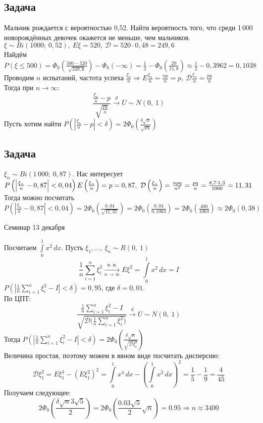 \documentclass[12pt, a4paper]{article}
\begin{document}
    \subsection*{Задача}
    Мальчик рождается с вероятностью 0,52. Найти вероятность того, что среди 1\,000 новорождённых девочек окажется не меньше, чем мальчиков.\\
    $\xi \sim Bi(1000;\ 0,52),\ E\xi = 520,\ \mathcal{D} = 520\cdot 0,48 = 249,6$\\
    Найдём $P(\xi \leq 500) = \Phi_0\left( \frac{500 - 520}{\sqrt{249,6}} \right) - \Phi_0(-\infty) = \frac{1}{2} - \Phi_0\left( \frac{20}{15,8} \right) \approx \frac{1}{2} - 0,3962 = 0,1038$\\
    Проводим $n$ испытаний, частота успеха $\frac{\xi_n}{n}\Rightarrow E\frac{\xi_n}{n} = \frac{np}{n} = p,\ \mathcal{D}\frac{\xi_n}{n} = \frac{pq}{n}$\\
    Тогда при $n\to\infty$:
    \[\frac{\frac{\xi_n}{n} - p}{\sqrt{\frac{pq}{n}}}\xrightarrow{d} U \sim N(0,\ 1)\]
    Пусть хотим найти $P\left( \left| \frac{\xi_n}{n} - p \right| < \delta\right) = 2\Phi_0\left( \frac{\delta\sqrt{n}}{\sqrt{pq}} \right)$
    \subsection*{Задача}
    $\xi_n \sim Bi(1\,000;\ 0,87)$. Нас интересует $P \left( \left| \frac{\xi_n}{n} - 0,87 \right| < 0,04 \right)\\
    E\left( \frac{\xi_n}{n} \right) = p = 0,87,\ \mathcal{D}\left( \frac{\xi_n}{n} \right) = \frac{npq}{n^2} = \frac{pq}{n} = \frac{8,7\cdot 1,3}{1000} = 11,31$\\
    Тогда можно посчитать $P \left( \left| \frac{\xi_n}{n} - 0,87 \right| < 0,04 \right) = 2\Phi_0\left( \frac{0,04}{\sqrt{11,31}} \right) = 2\Phi_0\left( \frac{0,04}{0,1063} \right) = 2\Phi_0\left( \frac{400}{1063} \right) \approx 2\Phi_0(0,38)$
    \begin{center}
        Семинар 13 декабря
    \end{center}
    Посчитаем $\displaystyle\int\limits_0^1 x^2\, dx$. Пусть $\xi_1,\dots,\ \xi_n \sim R(0,\ 1)$
    \[\frac{1}{n} \sum_{i = 1}^{n} \xi_i^2 \xrightarrow[n\to \infty]{\text{п. н.}} E\xi^2 = \int\limits_0^1 x^2\, dx = I\]
    $P\left( \left| \frac{1}{n} \sum_{i = 1}^{n} \xi_i^2 - I \right| < \delta \right) = 0,95$, где $\delta = 0,01$.\\
    По ЦПТ:
    \[\frac{\frac{1}{n}\sum_{i = 1}^{n} \xi_i^2 - I}{\sqrt{\mathcal{D}\big( \frac{1}{n} \sum_{i = 1}^{n} \xi_i^2 \big)}} \xrightarrow[]{d} U\sim N(0,\ 1)\]
    Тогда $P\left( \left| \frac{1}{n} \sum_{i = 1}^{n} \xi_i^2 - I \right| < \delta \right) = 2\Phi_0\left( \frac{\delta \sqrt{n}}{\sqrt{\mathcal{D}\xi^2_1}} \right)$\\
    Величина простая, поэтому можем в явном виде посчитать дисперсию:
    \[\mathcal{D}\xi^2_1 = E\xi_1^4 - (E\xi_1^2)^2 = \int\limits_0^1 x^4\, dx - \left( \int\limits_0^1 x^2 \, dx \right)^2 = \frac{1}{5} - \frac{1}{9} = \frac{4}{45}\]
    Получаем следующее:
    \[2\Phi_0 \left( \frac{\delta\sqrt{n} 3\sqrt{5}}{2} \right) = 2\Phi_0\left(\frac{0.03\sqrt{5}}{2}\sqrt{n}\right) = 0.95\Rightarrow n\approx 3400\]
\end{document}

